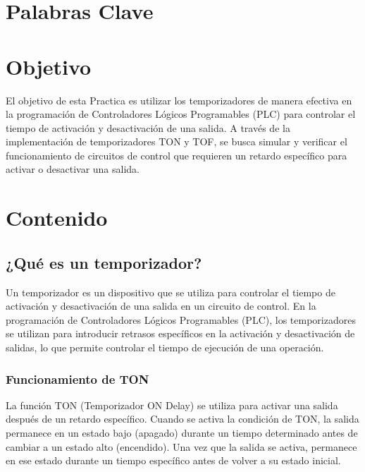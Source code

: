 \documentclass[12pt]{report}
\begin{document}
\tableofcontents
\newpage

\chapter*{Palabras Clave}

\begin{itemize}
\end{itemize}


\newpage

\chapter*{Objetivo}
  El objetivo de esta Practica es utilizar los temporizadores de manera efectiva en la programación de Controladores Lógicos Programables (PLC) para controlar el tiempo de activación y desactivación de una salida. A través de la implementación de temporizadores TON y TOF, se busca simular y verificar el funcionamiento de circuitos de control que requieren un retardo específico para activar o desactivar una salida.

\newpage

\chapter{Contenido}
\section{¿Qué es un temporizador?}
Un temporizador es un dispositivo que se utiliza para controlar el tiempo de activación y desactivación de una salida en un circuito de control. En la programación de Controladores Lógicos Programables (PLC), los temporizadores se utilizan para introducir retrasos específicos en la activación y desactivación de salidas, lo que permite controlar el tiempo de ejecución de una operación.
\subsection{Funcionamiento de TON}
La función TON (Temporizador ON Delay) se utiliza para activar una salida después de un retardo específico. Cuando se activa la condición de TON, la salida permanece en un estado bajo (apagado) durante un tiempo determinado antes de cambiar a un estado alto (encendido). Una vez que la salida se activa, permanece en ese estado durante un tiempo específico antes de volver a su estado inicial.
\end{document}
